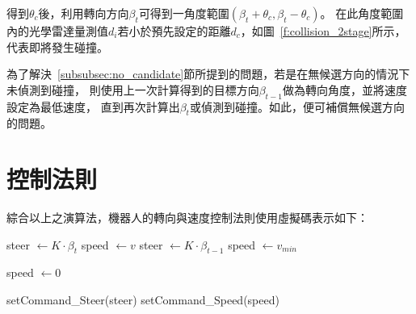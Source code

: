 得到$\theta_c$後，利用轉向方向$\beta_t$可得到一角度範圍$(\beta_t + \theta_c,\beta_t - \theta_c)$。
在此角度範圍內的光學雷達量測值$d_i$若小於預先設定的距離$d_c$，如圖~\ref{f:collision_2stage}所示，
代表即將發生碰撞。

為了解決~\ref{subsubsec:no_candidate}節所提到的問題，若是在無候選方向的情況下未偵測到碰撞，
則使用上一次計算得到的目標方向$\beta_{t-1}$做為轉向角度，並將速度設定為最低速度，
直到再次計算出$\beta_t$或偵測到碰撞。如此，便可補償無候選方向的問題。

\section{控制法則}
綜合以上之演算法，機器人的轉向與速度控制法則使用虛擬碼表示如下：
\begin{center}
	\begin{algorithmic}[H]
			\State \textrm{steer} $\gets K \cdot \beta_t$
			\State \textrm{speed} $\gets v$
		\Else
			\State \textrm{steer} $\gets K \cdot \beta_{t-1}$
			\State \textrm{speed} $\gets v_{min}$
		\EndIf

			\State \textrm{speed} $\gets 0$
		\EndIf

		\State \textrm{setCommand\_Steer(steer)}
		\State \textrm{setCommand\_Speed(speed)}
	\end{algorithmic}
\end{center}
